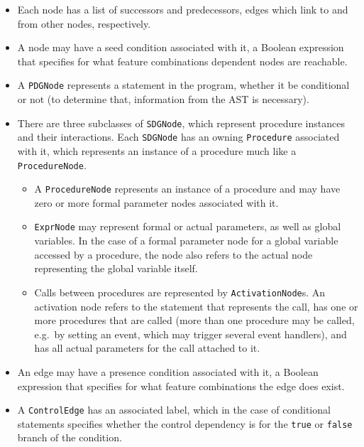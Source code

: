 \begin{itemize}
  \item Each node has a list of successors and predecessors, edges which link to and from other nodes, respectively.
  
  \item A node may have a seed condition associated with it, a Boolean expression that specifies for what feature 
  combinations dependent nodes are reachable.
  
  \item A \lstinline|PDGNode| represents a statement in the program, whether it be conditional or not (to determine 
  that, information from the AST is necessary).
  
  \item There are three subclasses of \lstinline|SDGNode|, which represent procedure instances and their interactions. 
  Each \lstinline|SDGNode| has an owning \lstinline|Procedure| associated with it, which represents an instance of a 
  procedure much like a \lstinline|ProcedureNode|.
  \begin{itemize}
    \item A \lstinline|ProcedureNode| represents an instance of a procedure and may have zero or more formal parameter 
    nodes associated with it.
    
    \item \lstinline|ExprNode| may represent formal or actual parameters, as well as global variables. In the case of a 
    formal parameter node for a global variable accessed by a procedure, the node also refers to the actual node 
    representing the global variable itself.
    
    \item Calls between procedures are represented by \lstinline|ActivationNode|s. An activation node refers to the 
    statement that represents the call, has one or more procedures that are called (more than one procedure may be 
    called, e.g.\ by setting an event, which may trigger several event handlers), and has all actual parameters for the 
    call attached to it.
  \end{itemize}
  
  \item An edge may have a presence condition associated with it, a Boolean expression that specifies for what feature 
  combinations the edge does exist.
  
  \item A \lstinline|ControlEdge| has an associated label, which in the case of conditional statements specifies 
  whether the control dependency is for the \lstinline|true| or \lstinline|false| branch of the condition.
\end{itemize}

